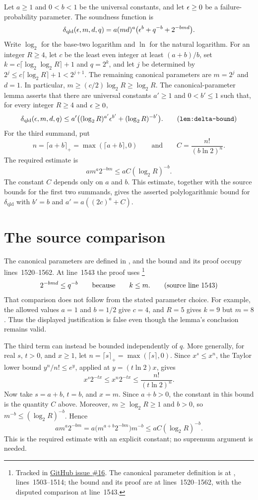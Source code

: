 \documentclass[11pt]{article}
\begin{document}
Let $a\geq 1$ and $0<b<1$ be the universal constants, and let $\epsilon\geq0$ be a
failure-probability parameter.  The soundness function is
\[
  \delta_{\mathrm{qld}}(\epsilon,m,d,q)
    = a(md)^a\bigl(\epsilon^b+q^{-b}+2^{-bmd}\bigr).
\]
Write $\log_2$ for the base-two logarithm and $\ln$ for the natural logarithm.
For an integer $R\geq4$, let $c$ be the least even integer at least $(a+b)/b$, set
$k=c\lceil\log_2\log_2 R\rceil+1$ and $q=2^k$, and let $j$ be determined by
$2^j\leq c\lceil\log_2 R\rceil+1<2^{j+1}$. The remaining canonical parameters
are $m=2^j$ and $d=1$. In particular,
$m\geq (c/2)\log_2 R\geq\log_2 R$.
The canonical-parameter lemma asserts that there are universal constants
$a'\geq1$ and $0<b'\leq1$ such that, for every integer $R\geq4$ and
$\epsilon\geq0$,
\[
  \delta_{\mathrm{qld}}(\eps,m,d,q)
    \leq a'\bigl((\log_2 R)^{a'}\eps^{b'}+(\log_2 R)^{-b'}\bigr).
  \tag{\texttt{lem:delta-bound}}
\]
For the third summand, put
\[
  n=\lceil a+b\rceil_{+}=\max(\lceil a+b\rceil,0)
  \qquad\text{and}\qquad
  C=\frac{n!}{(b\ln 2)^n}.
\]
The required estimate is
\[
  a m^a 2^{-bm} \leq aC(\log_2 R)^{-b}.
\]
The constant $C$ depends only on $a$ and $b$.  This estimate, together with
the source bounds for the first two summands, gives the asserted
polylogarithmic bound for $\delta_{\mathrm{qld}}$ with $b'=b$ and
$a'=a((2c)^a+C)$.

\section{The source comparison}

The canonical parameters are defined in \cite[lines~1503--1514]{Ji2020MIPStar},
and the bound and its proof occupy lines~1520--1562.  At line~1543 the proof
uses%
\footnote{Tracked in
\href{https://github.com/Dengnifer/MIPStarRE-QPBT/issues/16}{GitHub issue \#16}.
The canonical parameter definition is at
,
lines~1503--1514; the bound and its proof are at lines~1520--1562, with the
disputed comparison at line~1543.}
\[
  2^{-bmd}\leq q^{-b}
  \qquad\text{because}\qquad
  k\leq m.
  \tag{\text{source line 1543}}
\]
That comparison does not follow from the stated parameter choice.  For example,
the allowed values $a=1$ and $b=1/2$ give $c=4$, and $R=5$ gives $k=9$ but
$m=8$.  Thus the displayed justification is false even though the lemma's
conclusion remains valid.

The third term can instead be bounded independently of $q$.  More generally,
for real $s$, $t>0$, and $x\geq1$, let
$n=\lceil s\rceil_{+}=\max(\lceil s\rceil,0)$.  Since $x^s\leq x^n$, the
Taylor lower bound $y^n/n!\leq e^y$, applied at $y=(t\ln 2)x$, gives
\[
  x^s2^{-tx}
    \leq x^n2^{-tx}
    \leq \frac{n!}{(t\ln 2)^n}.
\]
Now take $s=a+b$, $t=b$, and $x=m$.  Since $a+b>0$, the constant in this
bound is the quantity $C$ above.  Moreover, $m\geq\log_2 R\geq1$ and $b>0$,
so $m^{-b}\leq(\log_2 R)^{-b}$.  Hence
\[
  a m^a2^{-bm}
    =a\bigl(m^{a+b}2^{-bm}\bigr)m^{-b}
    \leq aC(\log_2 R)^{-b}.
\]
This is the required estimate with an explicit constant; no supremum argument
is needed.
\end{document}
